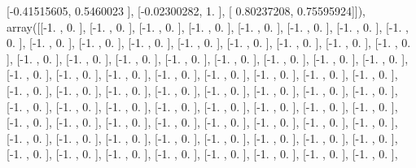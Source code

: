 \documentclass{article}
\begin{document}
       [-0.41515605,  0.5460023 ],
       [-0.02300282,  1.        ],
       [ 0.80237208,  0.75595924]]), array([[-1.        ,  0.        ],
       [-1.        ,  0.        ],
       [-1.        ,  0.        ],
       [-1.        ,  0.        ],
       [-1.        ,  0.        ],
       [-1.        ,  0.        ],
       [-1.        ,  0.        ],
       [-1.        ,  0.        ],
       [-1.        ,  0.        ],
       [-1.        ,  0.        ],
       [-1.        ,  0.        ],
       [-1.        ,  0.        ],
       [-1.        ,  0.        ],
       [-1.        ,  0.        ],
       [-1.        ,  0.        ],
       [-1.        ,  0.        ],
       [-1.        ,  0.        ],
       [-1.        ,  0.        ],
       [-1.        ,  0.        ],
       [-1.        ,  0.        ],
       [-1.        ,  0.        ],
       [-1.        ,  0.        ],
       [-1.        ,  0.        ],
       [-1.        ,  0.        ],
       [-1.        ,  0.        ],
       [-1.        ,  0.        ],
       [-1.        ,  0.        ],
       [-1.        ,  0.        ],
       [-1.        ,  0.        ],
       [-1.        ,  0.        ],
       [-1.        ,  0.        ],
       [-1.        ,  0.        ],
       [-1.        ,  0.        ],
       [-1.        ,  0.        ],
       [-1.        ,  0.        ],
       [-1.        ,  0.        ],
       [-1.        ,  0.        ],
       [-1.        ,  0.        ],
       [-1.        ,  0.        ],
       [-1.        ,  0.        ],
       [-1.        ,  0.        ],
       [-1.        ,  0.        ],
       [-1.        ,  0.        ],
       [-1.        ,  0.        ],
       [-1.        ,  0.        ],
       [-1.        ,  0.        ],
       [-1.        ,  0.        ],
       [-1.        ,  0.        ],
       [-1.        ,  0.        ],
       [-1.        ,  0.        ],
       [-1.        ,  0.        ],
       [-1.        ,  0.        ],
       [-1.        ,  0.        ],
       [-1.        ,  0.        ],
       [-1.        ,  0.        ],
       [-1.        ,  0.        ],
       [-1.        ,  0.        ],
       [-1.        ,  0.        ],
       [-1.        ,  0.        ],
       [-1.        ,  0.        ],
       [-1.        ,  0.        ],
       [-1.        ,  0.        ],
       [-1.        ,  0.        ],
       [-1.        ,  0.        ],
       [-1.        ,  0.        ],
       [-1.        ,  0.        ],
       [-1.        ,  0.        ],
       [-1.        ,  0.        ],
       [-1.        ,  0.        ],
       [-1.        ,  0.        ],
       [-1.        ,  0.        ],
       [-1.        ,  0.        ],
\end{document}
